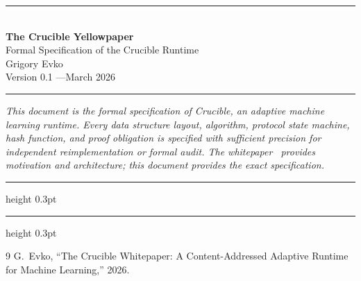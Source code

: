 \documentclass[11pt, a4paper]{article}
\theoremstyle{definition}
\theoremstyle{plain}
\theoremstyle{remark}
\begin{document}
\begin{center}
  \vspace*{0.8em}
  {\color{rulegray}\rule{\textwidth}{1.2pt}}\\[1.5em]
  {\fontsize{24}{28}\selectfont\sffamily\bfseries The Crucible Yellowpaper}\\[0.5em]
  {\large\sffamily Formal Specification of the Crucible Runtime}\\[1.8em]
  {\normalsize Grigory Evko}\\[0.3em]
  {\small\textcolor{black!45}{Version 0.1 \quad---\quad March 2026}}\\[1.5em]
  {\color{rulegray}\rule{\textwidth}{1.2pt}}
\end{center}
\thispagestyle{empty}
\vspace{1.2em}

\noindent
\textit{This document is the formal specification of Crucible, an adaptive machine learning runtime.
Every data structure layout, algorithm, protocol state machine, hash function, and proof obligation
is specified with sufficient precision for independent reimplementation or formal audit.
The whitepaper~\cite{crucible-whitepaper} provides motivation and architecture;
this document provides the exact specification.}

\vspace{0.8em}
{\color{black!15}\hrule height 0.3pt}
\vspace{0.4em}

\tableofcontents

\vspace{0.4em}
{\color{black!15}\hrule height 0.3pt}
\newpage






















\begin{thebibliography}{9}
G.~Evko, ``The Crucible Whitepaper: A Content-Addressed Adaptive Runtime for Machine Learning,'' 2026.
\end{thebibliography}
\end{document}
